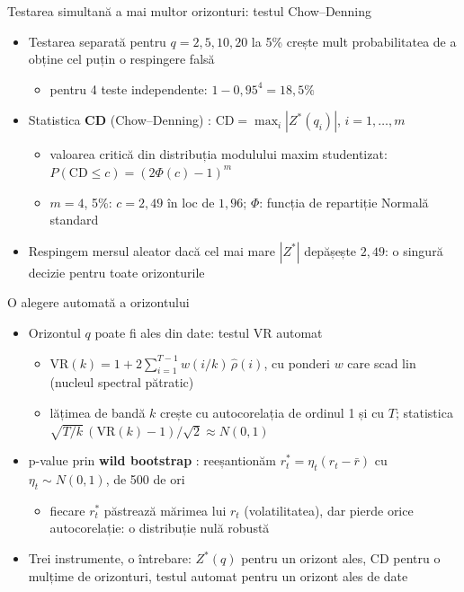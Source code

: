 \begin{frame}{Testarea simultană a mai multor orizonturi: testul Chow--Denning}
\itemsize{\small}
\begin{itemize}
    \item Testarea separată pentru $q = 2, 5, 10, 20$ la 5\% crește mult probabilitatea de a obține cel puțin o respingere falsă
    \begin{itemize}
        \item pentru 4 teste independente: $1 - 0{,}95^4 = 18{,}5\%$
    \end{itemize}
    \item Statistica \textbf{CD} (Chow--Denning) : $\mathrm{CD} = \max_{i} |Z^*(q_i)|$, $i = 1, \dots, m$
    \begin{itemize}
        \item valoarea critică din distribuția modulului maxim studentizat: $P(\mathrm{CD} \le c) = (2\Phi(c) - 1)^m$
        \item $m = 4$, 5\%: $c = 2{,}49$ în loc de $1{,}96$; $\Phi$: funcția de repartiție Normală standard
    \end{itemize}
    \item Respingem mersul aleator dacă cel mai mare $|Z^*|$ depășește $2{,}49$: o singură decizie pentru toate orizonturile
\end{itemize}
\end{frame}

\begin{frame}{O alegere automată a orizontului}
\itemsize{\small}
\begin{itemize}
    \item Orizontul $q$ poate fi ales din date: testul VR automat 
    \begin{itemize}
        \item $\mathrm{VR}(k) = 1 + 2\sum_{i=1}^{T-1} w(i/k)\,\hat\rho(i)$, cu ponderi $w$ care scad lin (nucleul spectral pătratic) 
        \item lățimea de bandă $k$ crește cu autocorelația de ordinul 1 și cu $T$; statistica $\sqrt{T/k}\,(\mathrm{VR}(k) - 1)/\sqrt2 \approx N(0, 1)$
    \end{itemize}
    \item p-value prin \textbf{wild bootstrap} : reeșantionăm $r_t^* = \eta_t(r_t - \bar r)$ cu $\eta_t \sim N(0, 1)$, de 500 de ori
    \begin{itemize}
        \item fiecare $r_t^*$ păstrează mărimea lui $r_t$ (volatilitatea), dar pierde orice autocorelație: o distribuție nulă robustă
    \end{itemize}
    \item Trei instrumente, o întrebare: $Z^*(q)$ pentru un orizont ales, CD pentru o mulțime de orizonturi, testul automat pentru un orizont ales de date
\end{itemize}
\end{frame}


